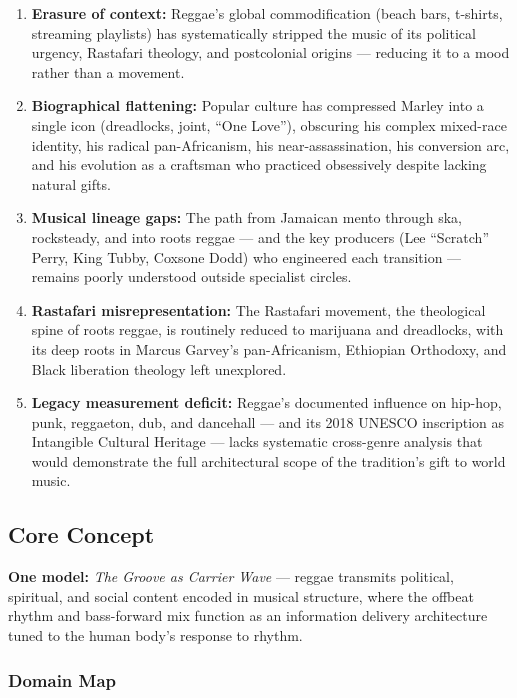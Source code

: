 \documentclass[11pt,letterpaper]{article}
\begin{document}
\begin{enumerate}
  \item \textbf{Erasure of context:} Reggae's global commodification (beach bars, t-shirts, streaming playlists) has systematically stripped the music of its political urgency, Rastafari theology, and postcolonial origins --- reducing it to a mood rather than a movement.

  \item \textbf{Biographical flattening:} Popular culture has compressed Marley into a single icon (dreadlocks, joint, ``One Love''), obscuring his complex mixed-race identity, his radical pan-Africanism, his near-assassination, his conversion arc, and his evolution as a craftsman who practiced obsessively despite lacking natural gifts.

  \item \textbf{Musical lineage gaps:} The path from Jamaican mento through ska, rocksteady, and into roots reggae --- and the key producers (Lee ``Scratch'' Perry, King Tubby, Coxsone Dodd) who engineered each transition --- remains poorly understood outside specialist circles.

  \item \textbf{Rastafari misrepresentation:} The Rastafari movement, the theological spine of roots reggae, is routinely reduced to marijuana and dreadlocks, with its deep roots in Marcus Garvey's pan-Africanism, Ethiopian Orthodoxy, and Black liberation theology left unexplored.

  \item \textbf{Legacy measurement deficit:} Reggae's documented influence on hip-hop, punk, reggaeton, dub, and dancehall --- and its 2018 UNESCO inscription as Intangible Cultural Heritage --- lacks systematic cross-genre analysis that would demonstrate the full architectural scope of the tradition's gift to world music.
\end{enumerate}

\subsection{Core Concept}

\textbf{One model:} \textit{The Groove as Carrier Wave} --- reggae transmits political, spiritual, and social content encoded in musical structure, where the offbeat rhythm and bass-forward mix function as an information delivery architecture tuned to the human body's response to rhythm.

\subsubsection{Domain Map}
\end{document}

